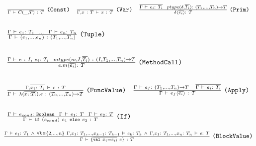
\begin{center}
\(\begin{array}{c c c}
	\frac{}{\Der{\Gamma}{C(\_, T)~:~T}}~\lst{(Const)}
	& 
	\frac{}{\Der{\Gamma,x~:~T}{x~:~T}}~\lst{(Var)}
	&
	\frac{
		\Ov{\DerEnv{e_i:~T_i}}~~
		ptype(\delta, \Ov{T_i}) :~(T_1,\dots,T_n) \to T
	}{
		\Apply{\delta}{\Ov{e_i}}:~T
	}~\lst{(Prim)} \\
	& & \\ %
\end{array}\) 


\(\begin{array}{c}
\frac{\DerEnv{e_1 :~T_1}~~\dots~~\DerEnv{e_n :~T_n}}
     {\DerEnv{(e_1,\dots,e_n)~:~(T_1,\dots,T_n)}}~\lst{(Tuple)} \\
\\ %
\end{array}\) 

\(\begin{array}{c}
\frac{
		\DerEnv{e~:~I,~e_i:~T_i}~~
		mtype(m, I, \Ov{T_i})~:~(I, T_1,\dots,T_n) \to T
	}
	{ \Apply{e.m}{\Ov{e_i}}:~T }~\lst{(MethodCall)} \\
\\ %
\end{array}\) 

\(\begin{array}{c c}
	\frac{\Der{\TEnv,\Ov{x_i:~T_i}}{e~:~T}}
	     {\Der{\Gamma}{\TyLam{x_i}{T_i}{e}~:~(T_0,\dots,T_n) \to T}}~\lst{(FuncValue)}
		  & 
	\frac{ \Der{\TEnv}{e_f:~(T_1,\dots,T_n) \to T}~~~\Ov{\Der{\TEnv}{e_i:~T_i}} }
		 { \Der{\Gamma}{\Apply{e_f}{\Ov{e_i}}~:~T} }~\lst{(Apply)} \\
& \\ %
\end{array}\) 

\(\begin{array}{c c}
	\frac{ \DerEnv{e_{cond} :~\lst{Boolean}}~~\DerEnv{e_1 :~T}~~\DerEnv{e_2 :~T} }
		{ \DerEnv{\IfThenElse{e_{cond}}{e_1}{e_2}~:~T} }~\lst{(If)}
		 & 
		 \\
		 & \\ %
\end{array}\) 
\(
	\frac{ 
		\DerEnv{e_1 :~T_1}~\wedge~
		\forall k\in\{2,\dots,n\}~\Der{\Gamma,x_1:~T_1,\dots,x_{k-1}:~T_{k-1}}{e_k:~T_k}~\wedge~
        \Der{\Gamma,x_1:~T_1,\dots,x_n:~T_n}{e:~T}
		}
		{ \DerEnv{\{ \Ov{\text{\lst{val}}~x_i = e_i;}~e\}~:~T} }~\lst{(BlockValue)}
\)


\end{center}


